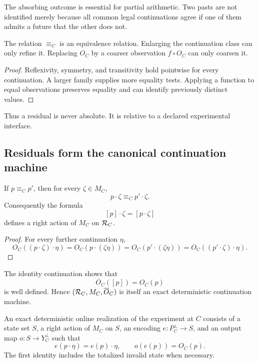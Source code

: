 The absorbing outcome is essential for partial arithmetic.  Two pasts are not
identified merely because all common legal continuations agree if one of them
admits a future that the other does not.

\begin{proposition}
\label{prop:residual-basic-properties}
The relation $\equiv_C$ is an equivalence relation.  Enlarging the continuation
class can only refine it.  Replacing $O_C$ by a coarser observation
$f\circ O_C$ can only coarsen it.
\end{proposition}

\begin{proof}
Reflexivity, symmetry, and transitivity hold pointwise for every continuation.
A larger family supplies more equality tests.  Applying a function to equal
observations preserves equality and can identify previously distinct values.
\end{proof}

Thus a residual is never absolute.  It is relative to a declared experimental
interface.

\subsection{Residuals form the canonical continuation machine}

\begin{proposition}
\label{prop:residual-right-congruence}
If $p\equiv_Cp'$, then for every $\zeta\in M_C$,
\[
  p\cdot\zeta\equiv_Cp'\cdot\zeta.
\]
Consequently the formula
\[
  [p]\cdot\zeta=[p\cdot\zeta]
\]
defines a right action of $M_C$ on $\mathcal R_C$.
\end{proposition}

\begin{proof}
For every further continuation $\eta$,
\[
  O_C((p\cdot\zeta)\cdot\eta)
  =O_C(p\cdot(\zeta\eta))
  =O_C(p'\cdot(\zeta\eta))
  =O_C((p'\cdot\zeta)\cdot\eta).
\]
\end{proof}

The identity continuation shows that
\[
  \overline O_C([p])=O_C(p)
\]
is well defined.  Hence $(\mathcal R_C,M_C,\overline O_C)$ is itself an exact
deterministic continuation machine.

\begin{definition}
An exact deterministic online realization of the experiment at $C$ consists
of a state set $S$, a right action of $M_C$ on $S$, an encoding
$e:P_C^\bot\to S$, and an output map $o:S\to Y_C^\bot$ such that
\begin{equation}
  e(p\cdot\eta)=e(p)\cdot\eta,
  \qquad
  o(e(p))=O_C(p).
  \label{eq:exact-machine-equivariance}
\end{equation}
The first identity includes the totalized invalid state when necessary.
\end{definition}

